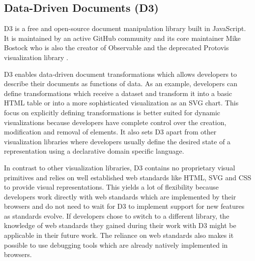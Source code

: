 \subsection{Data-Driven Documents (D3)}

D3 \parencite{D3} is a free and open-source document manipulation library built in JavaScript.
It is maintained by an active GitHub community and its core maintainer Mike Bostock who is also the creator of Observable \parencite{Observable} and the deprecated Protovis visualization library \parencite{Protovis}.

D3 enables data-driven document transformations which allows developers to describe their documents as functions of data.
As an example, developers can define transformations which receive a dataset and transform it into a basic HTML table or into a more sophisticated visualization as an SVG chart.
This focus on explicitly defining transformations is better suited for dynamic visualizations because developers have complete control over the creation, modification and removal of elements.
It also sets D3 apart from other visualization libraries where developers usually define the desired state of a representation using a declarative domain specific language.

In contrast to other visualization libraries, D3 contains no proprietary visual primitives and relies on well established web standards like HTML, SVG and CSS to provide visual representations.
This yields a lot of flexibility because developers work directly with web standards which are implemented by their browsers and do not need to wait for D3 to implement support for new features as standards evolve.
If developers chose to switch to a different library, the knowledge of web standards they gained during their work with D3 might be applicable in their future work.
The reliance on web standards also makes it possible to use debugging tools which are already natively implemented in browsers.

